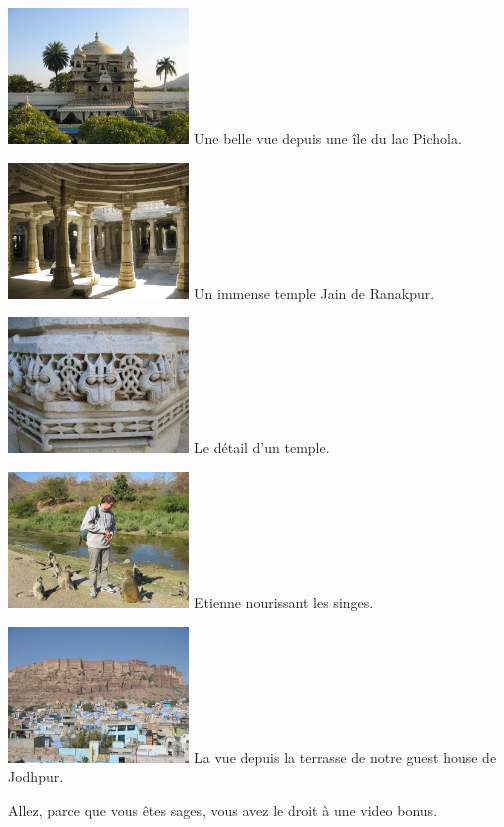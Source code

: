 \begin{multicols}{2}
\hspace*{-0.65cm}
\includegraphics[width=4.8cm]{articles/Il-commence-a-faire-chaud/picchola.jpg}
Une belle vue depuis une île du lac Pichola.

\hspace*{-0.65cm}
\includegraphics[width=4.8cm]{articles/Il-commence-a-faire-chaud/ranak.jpg}
Un immense temple Jain de Ranakpur.

\hspace*{-0.65cm}
\includegraphics[width=4.8cm]{articles/Il-commence-a-faire-chaud/ranak2.jpg}
Le détail d'un temple.

\hspace*{-0.65cm}
\includegraphics[width=4.8cm]{articles/Il-commence-a-faire-chaud/ranak3.jpg}
Etienne nourissant les singes.

\hspace*{-0.65cm}
\includegraphics[width=4.8cm]{articles/Il-commence-a-faire-chaud/ranak4.jpg}
La vue depuis la terrasse de notre guest house de Jodhpur.

Allez, parce que vous êtes sages, vous avez le droit à une video bonus.

\end{multicols}


